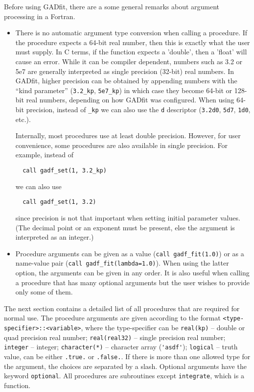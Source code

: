 \documentclass{article}
\begin{document}
Before using GADfit, there are a some general remarks about argument
processing in a Fortran.
\begin{itemize}
\item There is no automatic argument type conversion when calling a
  procedure. If the procedure expects a 64-bit real number, then this
  is exactly what the user must supply. In C terms, if the function
  expects a 'double', then a 'float' will cause an error. While it can
  be compiler dependent, numbers such as 3.2 or 5e7 are generally
  interpreted as single precision (32-bit) real numbers. In GADfit,
  higher precision can be obtained by appending numbers with the
  ``kind parameter'' (\verb+3.2_kp+, \verb+5e7_kp+) in which case they
  become 64-bit or 128-bit real numbers, depending on how GADfit was
  configured. When using 64-bit precision, instead of \verb+_kp+ we
  can also use the \texttt{d} descriptor (\texttt{3.2d0},
  \texttt{5d7}, \texttt{1d0}, etc.).

  Internally, most procedures use at least double precision. However,
  for user convenience, some procedures are also available in single
  precision. For example, instead of
\begin{verbatim}
  call gadf_set(1, 3.2_kp)
\end{verbatim}
  we can also use
\begin{verbatim}
  call gadf_set(1, 3.2)
\end{verbatim}
  since precision is not that important when setting initial parameter
  values. (The decimal point or an exponent must be present, else the
  argument is interpreted as an integer.)

\item Procedure arguments can be given as a value
  (\verb+call gadf_fit(1.0)+) or as a name-value pair
  (\verb+call gadf_fit(lambda=1.0)+). When using the latter option,
  the arguments can be given in any order. It is also useful when
  calling a procedure that has many optional arguments but the user
  wishes to provide only some of them.
\end{itemize}
The next section contains a detailed list of all procedures that are
required for normal use. The procedure arguments are given according
to the format \verb+<type-specifier>::<variable>+, where the
type-specifier can be \verb+real(kp)+ -- double or quad precision real
number; \verb+real(real32)+ -- single precision real number;
\verb+integer+ -- integer; \verb+character(*)+ -- character array
(\verb+'asdf'+); \verb+logical+ -- truth value, can be either
\verb+.true.+ or \verb+.false.+. If there is more than one allowed
type for the argument, the choices are separated by a slash. Optional
arguments have the keyword \verb+optional+. All procedures are
subroutines except \verb+integrate+, which is a function.
\end{document}
